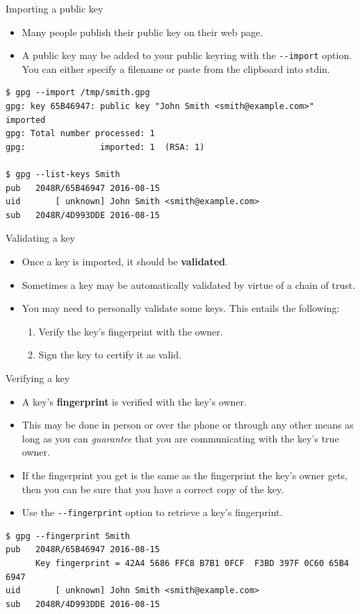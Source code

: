 \documentclass[%
mode=present,%
paper=smartboard,
size=20pt,
]{powerdot}
\newcommand\vsp{\vspace{-16mm}}
\newcommand{\clopt}[1]{\texttt{{-}#1}}
\begin{document}
\begin{slide}[method=direct]{Importing a public key}
  \begin{itemize}
  \item Many people publish their public key on their web page.
  \item A public key may be added to your public keyring with the
    \clopt{-import} option. You can either specify a filename or paste
    from the clipboard into stdin.
  \end{itemize}
\begin{verbatim}
$ gpg --import /tmp/smith.gpg
gpg: key 65B46947: public key "John Smith <smith@example.com>" imported
gpg: Total number processed: 1
gpg:               imported: 1  (RSA: 1)

$ gpg --list-keys Smith
pub   2048R/65B46947 2016-08-15
uid       [ unknown] John Smith <smith@example.com>
sub   2048R/4D993DDE 2016-08-15
\end{verbatim}
\end{slide}

\begin{slide}{Validating a key}
  \begin{itemize}
  \item Once a key is imported, it should be \textbf{validated}.
  \item Sometimes a key may be automatically validated by virtue of a
    chain of trust.
  \item You may need to personally validate some keys.  This entails
    the following:
    \begin{enumerate}
    \item Verify the key's fingerprint with the owner.
    \item Sign the key to certify it as valid.
    \end{enumerate}
  \end{itemize}
\end{slide}

\begin{slide}[method=direct]{Verifying a key}
  \begin{itemize}
  \item A key's \textbf{fingerprint} is verified with the key's owner.
  \item This may be done in person or over the phone or through any
    other means as long as you can \emph{guarantee} that you are
    communicating with the key's true owner.
  \item If the fingerprint you get is the same as the fingerprint the
    key's owner gets, then you can be sure that you have a correct
    copy of the key.
  \item Use the \clopt{-fingerprint} option to retrieve a key's
    fingerprint.
  \end{itemize}
\vsp
\begin{verbatim}
$ gpg --fingerprint Smith
pub   2048R/65B46947 2016-08-15
      Key fingerprint = 42A4 5686 FFC8 B7B1 0FCF  F3BD 397F 0C60 65B4 6947
uid       [ unknown] John Smith <smith@example.com>
sub   2048R/4D993DDE 2016-08-15
\end{verbatim}
\end{slide}
\end{document}
